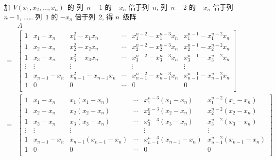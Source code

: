 \documentclass[../libro.tex]{subfiles}
\begin{document}
\begin{example}
    加 \(V(x_1, x_2, \dots, x_n)\)~的%
    列~\(n-1\) 的 \(-x_n\) 倍于列~\(n\),
    列~\(n-2\) 的 \(-x_n\) 倍于列~\(n-1\),
    ……
    列~\(1\) 的 \(-x_n\) 倍于列~\(2\),
    得 \(n\)~级阵
    \begin{align*}
        & A
        \\
        = {} &
        \begin{bmatrix}
            1      & x_1 - x_n     & x_1^2 - x_1 x_n         & \cdots & x_1^{n-2} - x_1^{n-3} x_n         & x_1^{n-1} - x_1^{n-2} x_n         \\
            1      & x_2 - x_n     & x_2^2 - x_2 x_n         & \cdots & x_2^{n-2} - x_2^{n-3} x_n         & x_2^{n-1} - x_2^{n-2} x_n         \\
            1      & x_3 - x_n     & x_3^2 - x_3 x_n         & \cdots & x_3^{n-2} - x_3^{n-3} x_n         & x_3^{n-1} - x_3^{n-2} x_n         \\
            \vdots & \vdots        & \vdots                  & {}     & \vdots                            & \vdots                            \\
            1      & x_{n-1} - x_n & x_{n-1}^2 - x_{n-1} x_n & \cdots & x_{n-1}^{n-2} - x_{n-1}^{n-3} x_n & x_{n-1}^{n-1} - x_{n-1}^{n-2} x_n \\
            1      & 0             & 0                       & \cdots & 0                                 & 0                                 \\
        \end{bmatrix}
        \\
        = {} &
        \begin{bmatrix}
            1      & x_1 - x_n     & x_1 (x_1 - x_n)         & \cdots & x_1^{n-3} (x_1 - x_n)         & x_1^{n-2} (x_1 - x_n)         \\
            1      & x_2 - x_n     & x_2 (x_2 - x_n)         & \cdots & x_2^{n-3} (x_2 - x_n)         & x_2^{n-2} (x_2 - x_n)         \\
            1      & x_3 - x_n     & x_3 (x_3 - x_n)         & \cdots & x_3^{n-3} (x_3 - x_n)         & x_3^{n-2} (x_3 - x_n)         \\
            \vdots & \vdots        & \vdots                  & {}     & \vdots                        & \vdots                        \\
            1      & x_{n-1} - x_n & x_{n-1} (x_{n-1} - x_n) & \cdots & x_{n-1}^{n-3} (x_{n-1} - x_n) & x_{n-1}^{n-2} (x_{n-1} - x_n) \\
            1      & 0             & 0                       & \cdots & 0                             & 0                             \\

\end{bmatrix}
\end{align*}
\end{example}
\end{document}
